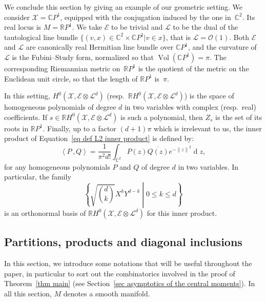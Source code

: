 \documentclass[AHL,Unicode,longabstracts,published]{cedram}
\DeclareMathOperator{\dmesure}{d}
\DeclareMathOperator{\Vol}{Vol}
\newcommand{\E}{\mathcal{E}}
\newcommand{\X}{\mathcal{X}}
\renewcommand{\L}{\mathcal{L}}
\newcommand{\clO}{\mathcal{O}}
\newcommand{\C}{\mathbb{C}}
\newcommand{\R}{\mathbb{R}}
\newcommand{\dx}{\dmesure\!}
\newcommand{\mvert}{\mathrel{}\middle|\mathrel{}}
\newcommand{\Norm}[1]{\left\lVert #1 \right\rVert}
\newcommand{\prsc}[2]{\left\langle #1\,, #2 \right\rangle}
\newcommand{\vol}[1]{\Vol\!\left(#1\right)}
\renewcommand{\H}{H^0(\X,\E \otimes \L^d)}
\renewcommand{\bar}{\overline}
\renewcommand{\leq}{\leqslant}
\begin{document}
\begin{exam}\label{ex Kostlan inner product}
We conclude this section by giving an example of our geometric setting. We consider $\X =\C P^1$, equipped with the conjugation induced by the one in~$\C^2$. Its real locus is $M=\R P^1$. We take $\E$ to be trivial and $\L$ to be the dual of the tautological line bundle $\{(v,x) \in \C^2 \times \C P^1 \vert v \in x \}$, that is $\L = \clO(1)$. Both $\E$ and $\L$ are canonically real Hermitian line bundle over $\C P^1$, and the curvature of $\L$ is the Fubini--Study form, normalized so that $\vol{\C P^1}=\pi$. The corresponding Riemannian metric on~$\R P^1$ is the quotient of the metric on the Euclidean unit circle, so that the length of $\R P^1$ is~$\pi$.

In this setting, $\H$ (resp.~$\R\H$) is the space of homogeneous polynomials of degree $d$ in two variables with complex (resp.~real) coefficients. If $s \in \R\H$ is such a polynomial, then $Z_s$ is the set of its roots in $\R P^1$. Finally, up to a factor $(d+1)\pi$ which is irrelevant to us, the inner product of Equation~\eqref{eq def L2 inner product} is defined by:
\[
\prsc{P}{Q} = \frac{1}{\pi^2d!} \int_{\C^2} P(z) \bar{Q(z)} e^{-\Norm{z}^2} \dx z,
\]
for any homogeneous polynomials $P$ and $Q$ of degree $d$ in two variables. In particular, the family
\[
\left\{\sqrt{\binom{d}{k}}X^kY^{d-k} \mvert 0\leq k\leq d\right\}
\]
 is an orthonormal basis of $\R\H$ for this inner product.
\end{exam}



\subsection{Partitions, products and diagonal inclusions}\label{subsec partitions products and diagonal inclusions}

In this section, we introduce some notations that will be useful throughout the paper, in particular to sort out the combinatorics involved in the proof of Theorem~\ref{thm main} (see Section~\ref{sec asymptotics of the central moments}). In all this section, $M$ denotes a smooth manifold.
\end{document}
